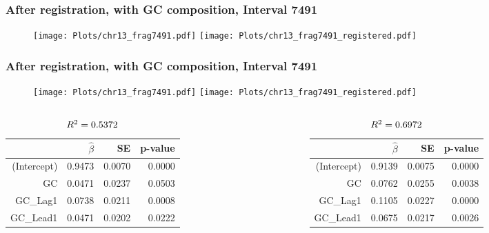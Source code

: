 \documentclass[10pt,dvipsnames,table]{beamer}
\begin{document}
\begin{frame}
\frametitle{After registration, with GC composition, Interval 7491}
\begin{figure}[t]
\texttt{[image: Plots/chr13\_frag7491.pdf]}
\texttt{[image: Plots/chr13\_frag7491\_registered.pdf]}
\end{figure}
\end{frame}

\begin{frame}
\frametitle{After registration, with GC composition, Interval 7491}
\vspace{-0.25cm}
\begin{figure}[t]
\texttt{[image: Plots/chr13\_frag7491.pdf]}
\hspace{0.5cm}
\texttt{[image: Plots/chr13\_frag7491\_registered.pdf]}
\end{figure}
\vspace{-0.5cm}

\begin{columns}
\begin{column}{0.5\textwidth}
\begin{table}[ht]
\centering
{\footnotesize{
\begin{tabular}{rrrr}
  \hline
  & $\hat{\beta}$ & SE & p-value \\ 
  \hline
  (Intercept) & 0.9473 & 0.0070 & 0.0000 \\ 
  GC & 0.0471 & 0.0237 & 0.0503 \\ 
  GC\_Lag1 & 0.0738 & 0.0211 & 0.0008 \\ 
  GC\_Lead1 & 0.0471 & 0.0202 & 0.0222 \\ 
  \hline
\end{tabular}
\caption{$\tiny{R^2 = 0.5372}$}
}}
\end{table}

\end{column}

\begin{column}{0.5\textwidth}
\begin{table}[ht]
\centering
{\footnotesize{
\begin{tabular}{rrrr}
  \hline
  & $\hat{\beta}$ & SE & p-value \\ 
  \hline
  (Intercept) & 0.9139 & 0.0075 & 0.0000 \\ 
  GC & 0.0762 & 0.0255 & 0.0038 \\ 
  GC\_Lag1 & 0.1105 & 0.0227 & 0.0000 \\ 
  GC\_Lead1 & 0.0675 & 0.0217 & 0.0026 \\ 
  \hline
\end{tabular}
\caption{$\tiny{R^2 = 0.6972}$}
}}
\end{table}

\end{column}
\end{columns}
\end{frame}
\end{document}
